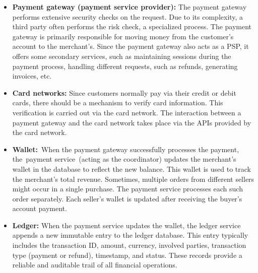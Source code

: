 \begin{itemize}
\item
\protect{}\label{aFYVsvLKG52BRryCfKfTd}
\textbf{Payment gateway (payment service provider):} The payment gateway performs extensive security checks on the request. Due to its complexity, a third party often performs the risk check, a specialized process. The payment gateway is primarily responsible for moving money from the customer's account to the merchant's. Since the payment gateway also acts as a PSP, it offers some secondary services, such as maintaining sessions during the payment process, handling different requests, such as refunds, generating invoices, etc.
\item
\protect{}\label{va2hniZq7fUnaPcMuFsGN}
\textbf{Card networks:} Since customers normally pay via their credit or debit cards, there should be a mechanism to verify card information. This verification is carried out via the card network. The interaction between a payment gateway and the card network takes place via the APIs provided by the card network.
\item
\protect{}\label{3pD1Vg0MEOIVW3TDdoDOA}
\textbf{Wallet:}~When the payment gateway successfully processes the payment, the~payment service~(acting as the coordinator) updates the merchant's wallet in the database to reflect the new balance. This wallet is used to track the merchant's total revenue. Sometimes, multiple orders from different sellers might occur in a single purchase. The payment service processes each such order separately. Each seller's wallet is updated after receiving the buyer's account payment.
\item
\protect{}\label{ezxBOkiUi2j_Lq7ryRvLJ}
\textbf{Ledger:} When the payment service updates the wallet, the ledger service appends a new immutable entry to the ledger database. This entry typically includes the transaction ID, amount, currency, involved parties, transaction type (payment or refund), timestamp, and status. These records provide a reliable and auditable trail of all financial operations.
\end{itemize}

